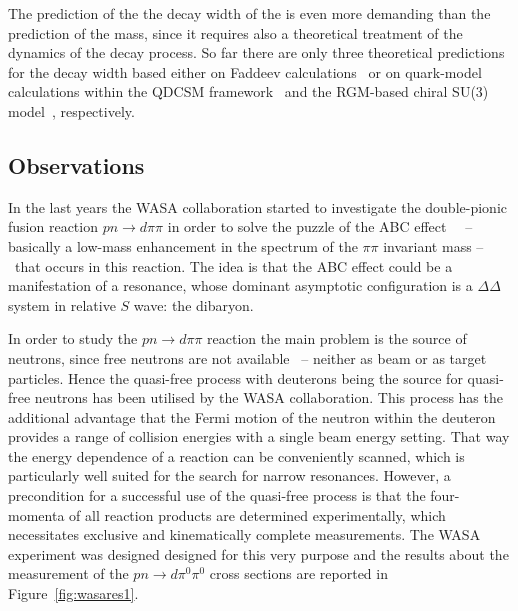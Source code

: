 The prediction of the the decay width of the \dst is even more demanding than the prediction of the mass, since
it requires also a theoretical treatment of the dynamics of the decay process.
So far there are only three theoretical predictions for the decay width based either on Faddeev
calculations~\cite{reanalysis,haddin,haddin1} or on quark-model calculations within the
QDCSM  framework~\cite{widthpred1,dsqm1} and the RGM-based chiral SU(3) 
model~\cite{widthpred2,widthpred3}, respectively.

%
\subsection{Observations} \label{sec:2.2.2}

In the last years the WASA collaboration started to investigate the double-pionic fusion reaction 
$pn \rightarrow d \pi \pi$ in order to solve the puzzle of the ABC effect~\cite{abc} \ -- basically
a low-mass enhancement in the spectrum of the $\pi \pi$ invariant mass -- \ that occurs in this
reaction.
The idea is that the ABC effect could be a manifestation of a resonance, whose dominant asymptotic
configuration is a $\Delta \Delta$ system in relative $S$ wave: the \ds dibaryon.

In order to study the $pn \rightarrow d \pi \pi$ reaction the main problem is the source of
neutrons, since free neutrons are not available \ -- neither as beam or as target particles. 
Hence the quasi-free process with deuterons being the source for quasi-free neutrons has been utilised
by the WASA collaboration.
This process has the additional advantage that the Fermi motion of the neutron within the deuteron 
provides a range of collision energies with a single beam energy setting.
That way the energy dependence of a reaction can be conveniently scanned, which is particularly well
suited for the search for narrow resonances.
However, a precondition for a successful use of the quasi-free process is that the four-momenta of all
reaction products are determined experimentally, which necessitates exclusive and kinematically complete
measurements.
The WASA experiment was designed designed for this very purpose and the results about the measurement 
of the $pn \rightarrow d \pi^{0} \pi^{0}$ cross sections are reported in Figure~\ref{fig:wasares1}.

